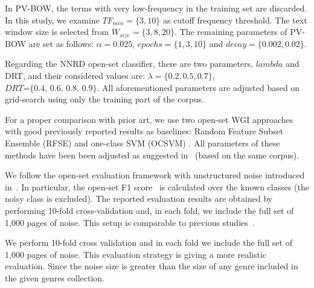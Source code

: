 In PV-BOW, the terms with very low-frequency in the training set are discarded. In this study, we examine $TF_{min}=\{3,10\}$ as cutoff frequency threshold. The text window size is selected from $W_{size}=\{3,8,20\}$. The remaining parameters of PV-BOW are set as follows: $\alpha=0.025$, $epochs=\{1, 3, 10\}$ and $decay=\{0.002, 0.02\}$.

Regarding the NNRD open-set classifier, there are two parameters, $lambda$ and DRT, and their considered values are: $\lambda =\{0.2, 0.5, 0.7\}$, $DRT\textit{=\{0.4, 0.6, 0.8, 0.9\}}$. All aforementioned parameters are adjusted based on grid-search using only the training part of the corpus.

For a proper comparison with prior art, we use two open-set WGI approaches with good previously reported results as baselines: Random Feature Subset Ensemble (RFSE) and one-class SVM (OCSVM) \parencite{pritsos2013open,pritsos2018open}. All parameters of these methods have been been adjusted as suggested in~\parencite{pritsos2018open} (based on the same corpus).

We follow the open-set evaluation framework with unstructured noise introduced in~\parencite{pritsos2018open}. In particular, the open-set F1 score~\parencite{mendesjunior2016} is calculated over the known classes (the noisy class is excluded). The reported evaluation results are obtained by performing 10-fold cross-validation and, in each fold, we include the full set of 1,000 pages of noise. This setup is comparable to previous studies~\parencite{pritsos2018open}.

We perform  10-fold cross validation and in each fold we include the full set of 1,000 pages of noise. This evaluation strategy is giving a more realistic evaluation. Since the noise size is greater than the size of any genre included in the given genres collection.


